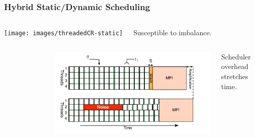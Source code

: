 \begin{frame}[label=hybridstatdyn]
\frametitle{Hybrid Static/Dynamic Scheduling}
\begin{columns}
  \vspace*{-0.2in}
  
 \vspace*{-0.2in}
  \begin{center}
    \texttt{[image: images/threadedCR-static]}
  \end{center} 
  \vspace*{-0.4in}
  \begin{center} 
    \tiny Susceptible to imbalance.  
  \end{center} 
\end{columns}
\begin{columns}
\vspace*{-0.15in}
\begin{figure}

\end{figure}
  \begin{center}
 \includegraphics[scale=0.31]{images/threadedCompRegion-dynamic.pdf}
  \end{center}
\vspace*{-0.3in}
\begin{center}
{\tiny Scheduler overhead stretches time.}
\end{center}
\end{columns}
\begin{columns}
\vspace*{-0.1in}
\begin{figure} 


\end{figure}
\end{columns}
\end{frame}
